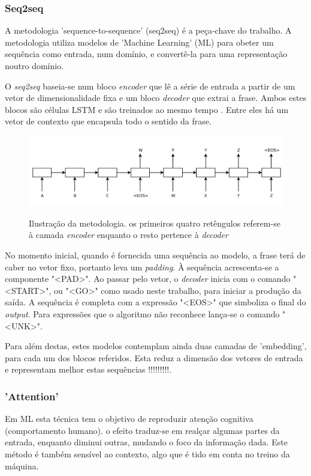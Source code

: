 \documentclass{article}
\begin{document}
\subsubsection{Seq2seq}
A metodologia 'sequence-to-sequence' (seq2seq) é a peça-chave do trabalho. A metodologia utiliza modelos de 'Machine Learning' (ML) para obeter um sequência como entrada, num domínio, e convertê-la para uma representação noutro domínio. 

O \textit{seq2seq} baseia-se num bloco \textit{encoder} que lê a série de entrada a partir de um vetor de dimensionalidade fixa e um bloco \textit{decoder} que extrai a frase. Ambos estes blocos são células LSTM e são treinados ao mesmo tempo \cite{sutskever2014sequence}. Entre eles há um vetor de contexto que encapsula todo o sentido da frase.

\begin{figure}[h]
    \centering
    \includegraphics[scale=0.3]{encoder_decoder.png}
    \caption{Ilustração da metodologia. os primeiros quatro retêngulos referem-se à camada \textit{encoder} enquanto o resto pertence à \textit{decoder}}
    \cite{sutskever2014sequence}
    \label{fig1}
\end{figure}


No momento inicial, quando é fornecida uma sequência ao modelo, a frase terá de caber no vetor fixo, portanto leva um \textit{padding}. À sequência acrescenta-se a componente "\textless PAD\textgreater ". Ao passar pelo vetor, o \textit{decoder} inicia com o comando "\textless START\textgreater ", ou "\textless GO\textgreater " como usado neste trabalho, para iniciar a produção da saída. A sequência é completa com a expressão "\textless EOS\textgreater " que simboliza o final do \textit{output}. Para expressões que o algoritmo não reconhece lança-se o comando "\textless UNK\textgreater ".

Para além destas, estes modelos contemplam ainda duas camadas de 'embedding', para cada um dos blocos referidos. Esta reduz a dimensão dos vetores de entrada e representam melhor estas sequências !!!!!!!!!. 

\subsubsection{'Attention'}
Em ML esta técnica tem o objetivo de reproduzir atenção cognitiva (comportamento humano). o efeito traduz-se em realçar algumas partes da entrada, enquanto diminui outras, mudando o foco da informação dada. Este método é também sensível ao contexto, algo que é tido em conta no treino da máquina. 
\end{document}
